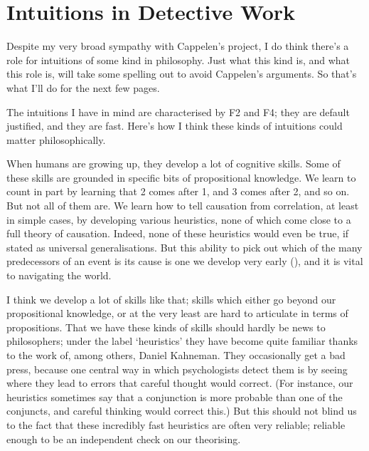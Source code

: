 \documentclass[
  11pt,
  letterpaper,
  DIV=11,
  numbers=noendperiod,
  twoside]{scrartcl}
\begin{document}
\section{Intuitions in Detective Work}\label{sec-Detective}

Despite my very broad sympathy with Cappelen's project, I do think
there's a role for intuitions of some kind in philosophy. Just what this
kind is, and what this role is, will take some spelling out to avoid
Cappelen's arguments. So that's what I'll do for the next few pages.

The intuitions I have in mind are characterised by F2 and F4; they are
default justified, and they are fast. Here's how I think these kinds of
intuitions could matter philosophically.

When humans are growing up, they develop a lot of cognitive skills. Some
of these skills are grounded in specific bits of propositional
knowledge. We learn to count in part by learning that 2 comes after 1,
and 3 comes after 2, and so on. But not all of them are. We learn how to
tell causation from correlation, at least in simple cases, by developing
various heuristics, none of which come close to a full theory of
causation. Indeed, none of these heuristics would even be true, if
stated as universal generalisations. But this ability to pick out which
of the many predecessors of an event is its cause is one we develop very
early (), and it is vital
to navigating the world.

I think we develop a lot of skills like that; skills which either go
beyond our propositional knowledge, or at the very least are hard to
articulate in terms of propositions. That we have these kinds of skills
should hardly be news to philosophers; under the label `heuristics' they
have become quite familiar thanks to the work of, among others, Daniel
Kahneman. They occasionally get a bad press, because one central way in
which psychologists detect them is by seeing where they lead to errors
that careful thought would correct. (For instance, our heuristics
sometimes say that a conjunction is more probable than one of the
conjuncts, and careful thinking would correct this.) But this should not
blind us to the fact that these incredibly fast heuristics are often
very reliable; reliable enough to be an independent check on our
theorising.
\end{document}
